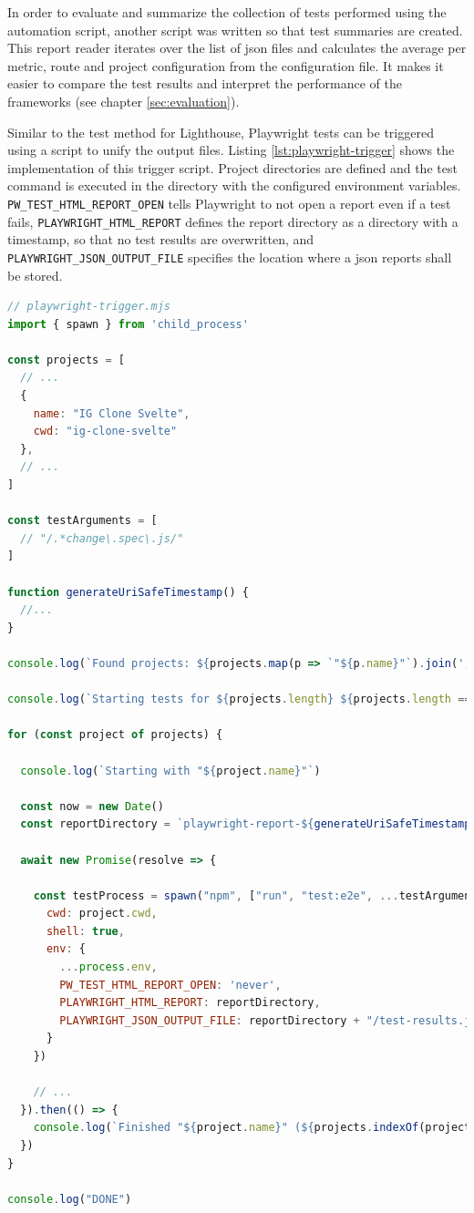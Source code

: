 \documentclass[a4paper, 10pt]{article}
\begin{document}
In order to evaluate and summarize the collection of tests performed using the automation script, another script was written so that test summaries are created.
This report reader iterates over the list of \acrshort{json} files and calculates the average per metric, route and project configuration from the configuration file.
It makes it easier to compare the test results and interpret the performance of the frameworks (see chapter \ref{sec:evaluation}).

Similar to the test method for Lighthouse, Playwright tests can be triggered using a script to unify the output files.
Listing \ref{lst:playwright-trigger} shows the implementation of this trigger script.
Project directories are defined and the test command is executed in the directory with the configured environment variables.
\verb|PW_TEST_HTML_REPORT_OPEN| tells Playwright to not open a report even if a test fails, \verb|PLAYWRIGHT_HTML_REPORT| defines the report directory as a directory with a timestamp, so that no test results are overwritten, and \verb|PLAYWRIGHT_JSON_OUTPUT_FILE| specifies the location where a \acrshort{json} reports shall be stored.

\begin{lstlisting}[caption={Trigger script for Playwright tests}, label={lst:playwright-trigger}, language=JavaScript]
// playwright-trigger.mjs
import { spawn } from 'child_process'

const projects = [
  // ...
  {
    name: "IG Clone Svelte",
    cwd: "ig-clone-svelte"
  },
  // ...
]

const testArguments = [
  // "/.*change\.spec\.js/"
]

function generateUriSafeTimestamp() {
  //...
}

console.log(`Found projects: ${projects.map(p => `"${p.name}"`).join(', ')}`)

console.log(`Starting tests for ${projects.length} ${projects.length == 1 ? 'project' : 'projects'}...`)

for (const project of projects) {

  console.log(`Starting with "${project.name}"`)

  const now = new Date()
  const reportDirectory = `playwright-report-${generateUriSafeTimestamp()}`

  await new Promise(resolve => {

    const testProcess = spawn("npm", ["run", "test:e2e", ...testArguments], {
      cwd: project.cwd,
      shell: true,
      env: {
        ...process.env,
        PW_TEST_HTML_REPORT_OPEN: 'never',
        PLAYWRIGHT_HTML_REPORT: reportDirectory,
        PLAYWRIGHT_JSON_OUTPUT_FILE: reportDirectory + "/test-results.json"
      }
    })

    // ...
  }).then(() => {
    console.log(`Finished "${project.name}" (${projects.indexOf(project) + 1}/${projects.length})`)
  })
}

console.log("DONE")
\end{lstlisting}
\end{document}
